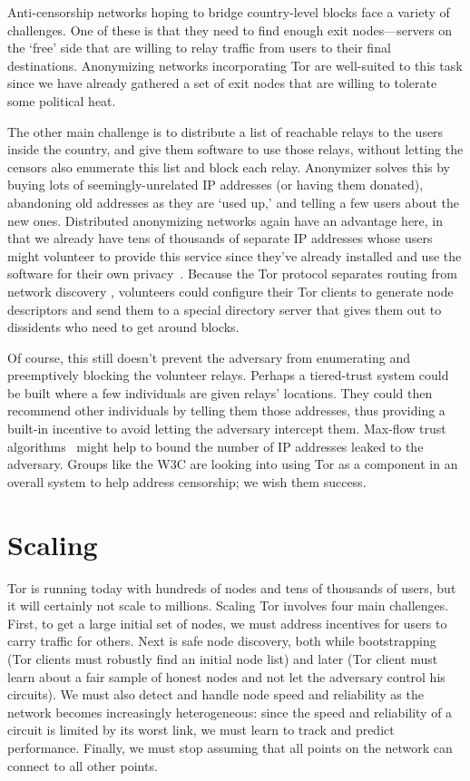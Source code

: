 \documentclass{llncs}
\begin{document}
Anti-censorship networks hoping to bridge country-level blocks face
a variety of challenges. One of these is that they need to find enough
exit nodes---servers on the `free' side that are willing to relay
traffic from users to their final destinations. Anonymizing
networks incorporating Tor are well-suited to this task since we have
already gathered a set of exit nodes that are willing to tolerate some
political heat.

The other main challenge is to distribute a list of reachable relays
to the users inside the country, and give them software to use those relays,
without letting the censors also enumerate this list and block each
relay. Anonymizer solves this by buying lots of seemingly-unrelated IP
addresses (or having them donated), abandoning old addresses as they are
`used up,' and telling a few users about the new ones. Distributed
anonymizing networks again have an advantage here, in that we already
have tens of thousands of separate IP addresses whose users might
volunteer to provide this service since they've already installed and use
the software for their own privacy~\cite{koepsell:wpes2004}. Because
the Tor protocol separates routing from network discovery \cite{tor-design},
volunteers could configure their Tor clients
to generate node descriptors and send them to a special directory
server that gives them out to dissidents who need to get around blocks.

Of course, this still doesn't prevent the adversary
from enumerating and preemptively blocking the volunteer relays.
Perhaps a tiered-trust system could be built where a few individuals are
given relays' locations. They could then recommend other individuals
by telling them
those addresses, thus providing a built-in incentive to avoid letting the
adversary intercept them. Max-flow trust algorithms~\cite{advogato}
might help to bound the number of IP addresses leaked to the adversary. Groups
like the W3C are looking into using Tor as a component in an overall system to
help address censorship; we wish them success.


\section{Scaling}
\label{sec:scaling}

Tor is running today with hundreds of nodes and tens of thousands of
users, but it will certainly not scale to millions.
Scaling Tor involves four main challenges. First, to get a
large initial set of nodes, we must address incentives for
users to carry traffic for others. Next is safe node discovery, both
while bootstrapping (Tor clients must robustly find an initial
node list) and later (Tor client must learn about a fair sample
of honest nodes and not let the adversary control his circuits).
We must also detect and handle node speed and reliability as the network
becomes increasingly heterogeneous: since the speed and reliability
of a circuit is limited by its worst link, we must learn to track and
predict performance. Finally, we must stop assuming that all points on
the network can connect to all other points.
\end{document}
